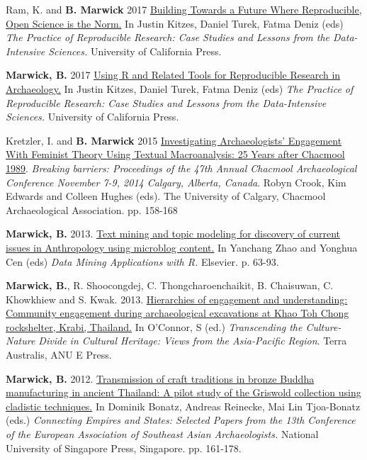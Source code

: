 \documentclass[11pt,article,oneside]{memoir}
\begin{document}
{{{{\ind Ram, K. and \textbf{B. Marwick} 2017 \href{https://www.practicereproducibleresearch.org/core-chapters/6-future.html}{Building Towards a Future Where Reproducible, Open Science is the Norm.} In Justin Kitzes, Daniel Turek, Fatma Deniz (eds) \textit{The Practice of Reproducible Research: Case Studies and Lessons from the Data-Intensive Sciences.} University of California Press.

\ind \textbf{Marwick, B.} 2017 \href{https://www.practicereproducibleresearch.org/case-studies/benmarwick.html}{Using R and Related Tools for Reproducible Research in Archaeology.} In Justin Kitzes, Daniel Turek, Fatma Deniz (eds) \textit{The Practice of Reproducible Research: Case Studies and Lessons from the Data-Intensive Sciences.} University of California Press. 

\ind Kretzler, I. and \textbf{B. Marwick} 2015 \href{http://faculty.washington.edu/bmarwick/PDFs/Kretzler_Marwick_2014_Chacmool.pdf}{Investigating Archaeologists' Engagement With Feminist Theory Using Textual Macroanalysis: 25 Years after Chacmool 1989}. \textit{Breaking barriers: Proceedings of the 47th Annual Chacmool Archaeological Conference November 7-9, 2014 Calgary, Alberta, Canada}. Robyn Crook, Kim Edwards and Colleen Hughes (eds). The University of Calgary, Chacmool Archaeological Association. pp. 158-168

\ind \textbf{Marwick, B.} 2013. \href{http://faculty.washington.edu/bmarwick/PDFs/Marwick_2013_DMAR.pdf}{Text mining and topic modeling for discovery of current issues in Anthropology using microblog content.} In  Yanchang Zhao and Yonghua Cen (eds) \textit{Data Mining Applications with R.} Elsevier. p. 63-93.

\ind \textbf{Marwick, B.}, R. Shoocongdej, C. Thongcharoenchaikit, B. Chaisuwan, C. Khowkhiew and S. Kwak.  2013. \href{http://faculty.washington.edu/bmarwick/PDFs/Marwick_et_al_2013_community.pdf}{Hierarchies of engagement and understanding: Community engagement during archaeological excavations at Khao Toh Chong rockshelter, Krabi, Thailand.} In O’Connor, S (ed.) \textit{Transcending the Culture-Nature Divide in Cultural Heritage: Views from the Asia-Pacific Region}. Terra Australis, ANU E Press.

\ind \textbf{Marwick, B.} 2012. \href{http://faculty.washington.edu/bmarwick/PDFs/Marwick_2012_Buddha_cladistics.pdf}{Transmission of craft traditions in bronze Buddha manufacturing in ancient Thailand: A pilot study of the Griswold collection using cladistic techniques.} In Dominik Bonatz, Andreas Reinecke, Mai Lin Tjoa-Bonatz (eds.)\textit{ Connecting Empires and States: Selected Papers from the 13th Conference of the European Association of Southeast Asian Archaeologists.} National University of Singapore Press, Singapore. pp. 161-178.

}}}}
\end{document}
